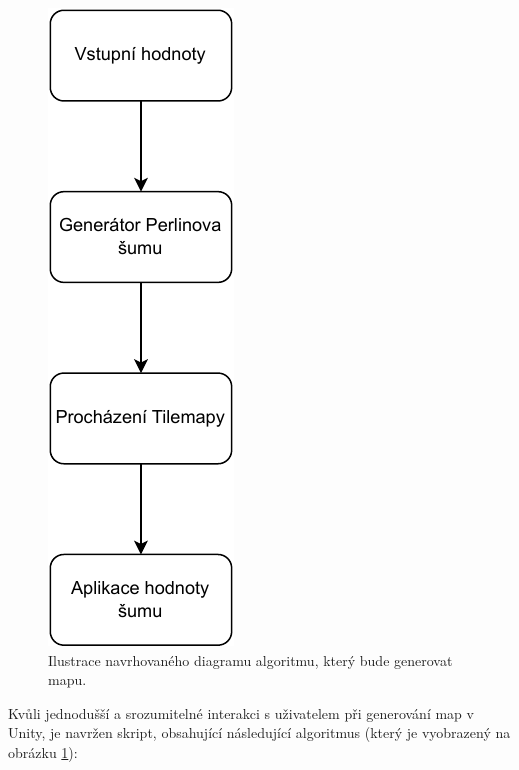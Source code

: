 \begin{figure}[H]
	\centering
	\includegraphics[scale=0.9]{obrazky-figures/generation.pdf}
	\caption{Ilustrace navrhovaného diagramu algoritmu, který bude generovat mapu.}
	\label{AlgoritmusDiagram}
\end{figure}

Kvůli jednodušší a srozumitelné interakci s uživatelem při generování map v Unity, je navržen skript, obsahující následující algoritmus (který je vyobrazený na obrázku \ref{AlgoritmusDiagram}):

